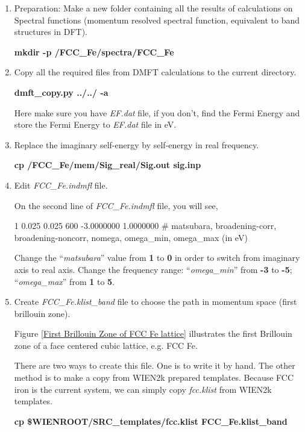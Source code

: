 \documentclass[12 pt]{article}
\begin{document}
  \begin{enumerate}

    \item Preparation: Make a new folder containing all the results of calculations on Spectral functions (momentum 
resolved spectral function, equivalent to band structures in DFT). 

  \textbf{mkdir -p /FCC\_Fe/spectra/FCC\_Fe}

    \item Copy all the required files from DMFT calculations to the current directory. 

  \textbf{dmft\_copy.py ../../ -a}

  Here make sure you have \emph{EF.dat} file, if you don't, find the Fermi Energy and store the Fermi Energy to 
\emph{EF.dat} file in eV.

    \item Replace the imaginary self-energy by self-energy in real frequency. 

  \textbf{cp /FCC\_Fe/mem/Sig\_real/Sig.out sig.inp}

    \item Edit \emph{FCC\_Fe.indmfl} file. 

  On the second line of \emph{FCC\_Fe.indmfl} file, you will see,

{\color{cyan}

  1 0.025 0.025	600	-3.0000000	1.0000000	\# matsubara, broadening-corr, broadening-noncorr, nomega, 
omega\_min, omega\_max (in eV)

}

  Change the ``\emph{matsubara}'' value from \textbf{1} to \textbf{0} in order to switch from imaginary axis to real 
axis. Change the frequency range: ``\emph{omega\_min}'' from \textbf{-3} to \textbf{-5}; ``\emph{omega\_max}'' from 
\textbf{1} to \textbf{5}.

    \item Create \emph{FCC\_Fe.klist\_band} file to choose the path in momentum space (first brillouin zone).

  Figure \ref{First Brillouin Zone of FCC Fe lattice} illustrates the first Brillouin zone of a face centered cubic 
lattice, e.g. FCC Fe. 

  There are two ways to create this file. One is to write it by hand. The other method is to make a copy from WIEN2k 
prepared templates. Because FCC iron is the current system, we can simply copy \emph{fcc.klist} from WIEN2k templates. 

  \textbf{cp \$WIENROOT/SRC\_templates/fcc.klist FCC\_Fe.klist\_band}


\end{enumerate}
\end{document}
